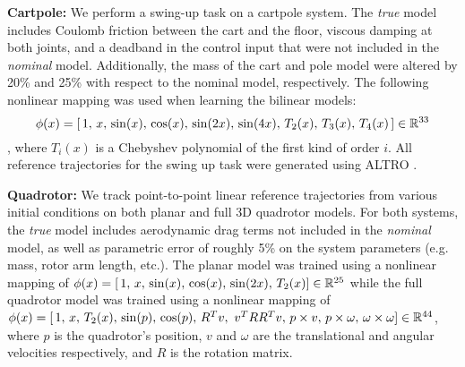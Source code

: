\documentclass[../root.tex]{subfiles}
\begin{document}

\textbf{Cartpole:} We perform a swing-up task on a cartpole system. The \textit{true} model
includes Coulomb friction between the cart and the floor, viscous damping at both joints,
and a deadband in the control input that were not included in the \textit{nominal} model.
Additionally, the mass of the cart and pole model were altered by 20\% and 25\% with respect
to the nominal model, respectively.  The following nonlinear mapping was used when learning
the bilinear models: 
$$\phi(x) = [\, 1,\,
x,\, \sin(x),\, \cos(x),\, \sin(2x),\, \sin(4x),\, T_2(x),\, T_3(x),\, T_4(x)\, ] \in
\mathbb{R}^{33}$$, where $T_i(x)$ is a Chebyshev polynomial of the first kind of order $i$. 
All reference trajectories for the swing up task were generated using ALTRO 
\cite{howell_ALTRO_2019,jackson_ALTROC_2021}.

\textbf{Quadrotor:} We track point-to-point linear reference trajectories from
various initial conditions on both planar and full 3D quadrotor models. For both systems,
the \textit{true} model includes aerodynamic drag terms not included in the \textit{nominal}
model, as well as parametric error of roughly 5\% on the system parameters (e.g. mass, rotor
arm length, etc.). The planar model was trained using a nonlinear mapping of $\phi(x) = [\,
1,\, x,\, \sin(x),\, \cos(x),\, \sin(2x),\, T_2(x) ] \in \mathbb{R}^{25}$ while the full quadrotor
model was trained using a nonlinear mapping of $\phi(x) = [\, 1,\, x,\, T_2(x),\, \sin(p),\,
\cos(p),\, R^{T}v,\ v^{T}RR^{T}v,\, p \times v,\, p \times \omega,\, \omega \times \omega ]
\in \mathbb{R}^{44}$, where $p$ is the quadrotor's position, $v$ and $\omega$ are the translational
and angular velocities respectively, and $R$ is the rotation matrix.
\end{document}
